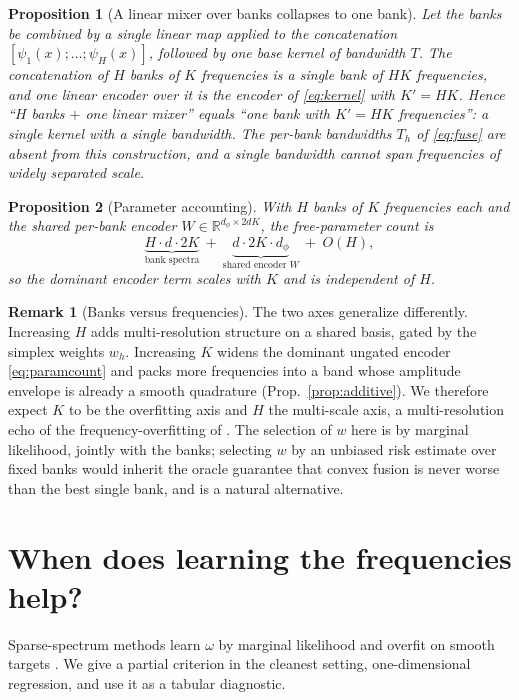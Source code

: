 \documentclass[11pt]{article}
\newtheorem{proposition}{Proposition}
\theoremstyle{definition}
\newtheorem{remark}{Remark}
\newcommand{\R}{\mathbb{R}}
\begin{document}
\begin{proposition}[A linear mixer over banks collapses to one bank]\label{prop:collapse}
Let the banks be combined by a single linear map applied to the concatenation
$[\psi_1(x);\dots;\psi_H(x)]$, followed by one base kernel of bandwidth $T$. The concatenation of
$H$ banks of $K$ frequencies is a single bank of $HK$ frequencies, and one linear encoder over it
is the encoder of \eqref{eq:kernel} with $K'=HK$. Hence ``$H$ banks $+$ one linear mixer'' equals
``one bank with $K'=HK$ frequencies'': a single kernel with a single bandwidth. The per-bank
bandwidths $T_h$ of \eqref{eq:fuse} are absent from this construction, and a single bandwidth
cannot span frequencies of widely separated scale.
\end{proposition}

\begin{proposition}[Parameter accounting]\label{prop:capacity}
With $H$ banks of $K$ frequencies each and the shared per-bank encoder $W\in\R^{d_\phi\times2dK}$,
the free-parameter count is
\begin{equation}
\underbrace{H\cdot d\cdot 2K}_{\text{bank spectra}}\ +\ \underbrace{d\cdot 2K\cdot d_\phi}_{\text{shared encoder }W}\ +\ O(H),
\label{eq:paramcount}
\end{equation}
so the dominant encoder term scales with $K$ and is independent of $H$.
\end{proposition}

\begin{remark}[Banks versus frequencies]\label{rem:capacity}
The two axes generalize differently. Increasing $H$ adds multi-resolution structure on a shared
basis, gated by the simplex weights $w_h$. Increasing $K$ widens the dominant ungated encoder
\eqref{eq:paramcount} and packs more frequencies into a band whose amplitude envelope is already a
smooth quadrature (Prop.~\ref{prop:additive}). We therefore expect $K$ to be the overfitting axis
and $H$ the multi-scale axis, a multi-resolution echo of the frequency-overfitting of
\citep{galturner2015}. The selection of $w$ here is by marginal likelihood, jointly with the
banks; selecting $w$ by an unbiased risk estimate over fixed banks
\citep{stein1981,golub1979gcv} would inherit the oracle guarantee that convex fusion is never
worse than the best single bank, and is a natural alternative.
\end{remark}

\section{When does learning the frequencies help?}\label{sec:freqlearn}
Sparse-spectrum methods learn $\omega$ by marginal likelihood and overfit on smooth targets
\citep{galturner2015,lazarogredilla2010}. We give a partial criterion in the cleanest setting,
one-dimensional regression, and use it as a tabular diagnostic.
\end{document}
